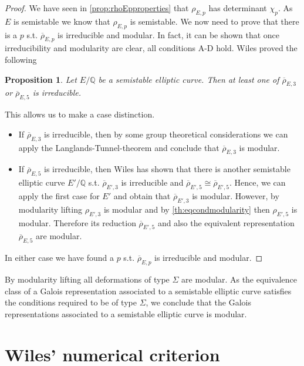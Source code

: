 \documentclass{article}
\theoremstyle{plain}%
\newtheorem{proposition}[theorem]{Proposition}
\theoremstyle{definition}
\theoremstyle{remark}
\begin{document}
\begin{proof}
    We have seen in \cref{prop:rhoEpproperties} that \(\rho_{E, p}\) has determinant \(\chi_p\). %
    As \(E\) is semistable we know that \(\rho_{E, p}\) is semistable. %
    We now need to prove that there is a \(p\) s.t. \(\overline{\rho}_{E,p}\) is irreducible and modular.
    In fact, it can be shown that once irreducibility and modularity are clear, all conditions A-D hold.
    Wiles proved the following
    \begin{proposition}
        Let \(E/\mathbb{Q}\) be a semistable elliptic curve. Then at least one of 
        \(\overline \rho_{E,3}\) or  \(\overline \rho_{E,5}\) is irreducible.
    \end{proposition}%
    This allows us to make a case distinction.
    \begin{itemize}
        \item If \(\overline \rho_{E,3}\) is irreducible, then by some group theoretical considerations 
        we can apply the Langlands-Tunnel-theorem and conclude that \(\overline{\rho}_{E, 3}\) is modular.
        \item If \(\overline \rho_{E,5}\) is irreducible, then Wiles has shown that there is another 
        semistable elliptic curve \(E'/\mathbb{Q}\) s.t. \(\overline{\rho}_{E',3}\) 
        is irreducible and \(\overline{\rho}_{E', 5} \cong \overline{\rho}_{E', 5}\).
        Hence, we can apply the first case for \(E'\) and obtain that \(\overline{\rho}_{E',3}\) is modular.
        However, by modularity lifting \(\rho_{E', 3}\) is modular and by \cref{th:eqcondmodularity}
        then \(\rho_{E', 5}\) is modular. Therefore its reduction \(\overline{\rho}_{E',5}\) and also 
        the equivalent representation \(\overline{\rho}_{E,5}\) are modular.
    \end{itemize}
    In either case we have found a \(p\) s.t. \(\overline{\rho}_{E,p}\) is irreducible and modular.
\end{proof}
By modularity lifting all deformations of type \(\Sigma\) are modular. As the equivalence class of a 
Galois representation associated to a semistable elliptic curve satisfies the conditions required to be of type \(\Sigma\),
we conclude that the Galois representations associated to a semistable elliptic curve is modular.

\newpage

\section{Wiles' numerical criterion}
\end{document}

